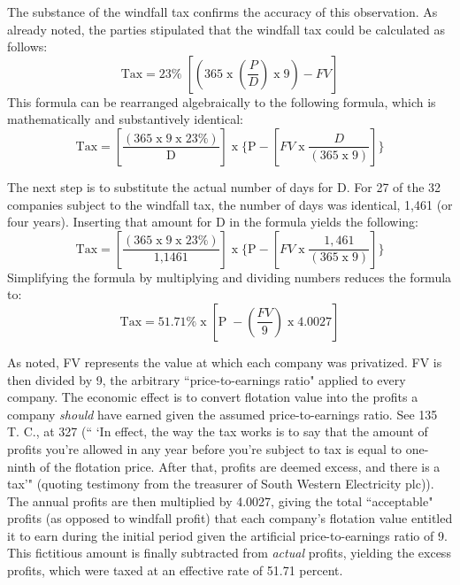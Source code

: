 \begin{select}
The substance of the windfall tax confirms the accuracy of this observation. As already noted, the parties stipulated that the windfall tax could be calculated as follows: 
\begin{displaymath}
 \textrm{Tax} = 23\%\;  [ (365\; \textrm{x}\;  (\frac{P}{D}) \; \textrm{x}\; 9)-FV]
 \end{displaymath}
This formula can be rearranged algebraically to the following formula, which is mathematically and substantively identical:
\begin{displaymath}
 \textrm{Tax} =[\frac{(365\; \textrm{x}\; 9\; \textrm{x}\; 23\%)}{\textrm{D}}] \; \textrm{x}\; \{ \textrm{P}-[FV \; \textrm{x} \; \frac{D}{(365\; \textrm{x}\; 9)}] \}
  \end{displaymath}

The next step is to substitute the actual number of days for D. For 27 of the 32 companies subject to the windfall tax, the number of days was identical, 1,461 (or four years). Inserting that amount for D in the formula yields the following: 
\begin{displaymath}
 \textrm{Tax} =[\frac{(365\; \textrm{x}\; 9\; \textrm{x}\; 23\%)}{\textrm{1,1461}}] \; \textrm{x}\; \{ \textrm{P}-[FV \; \textrm{x} \; \frac{1,461}{(365\; \textrm{x}\; 9)}] \}
  \end{displaymath}
Simplifying the formula by multiplying and dividing numbers reduces the formula to:
\begin{displaymath}
 \textrm{Tax} =51.71\% \; \textrm{x}\; [\textrm{P}\;-(\frac{FV}{9}) \; \textrm{x} \; 4.0027]
  \end{displaymath}

As noted, FV represents the value at which each company was privatized. FV is then divided by 9, the arbitrary ``price-to-earnings ratio" applied to every company. The economic effect is to convert flotation value into the profits a company \emph{should} have earned given the assumed price-to-earnings ratio. See 135 T. C., at 327 (`` `In effect, the way the tax works is to say that the amount of profits you're allowed in any year before you're subject to tax is equal to one-ninth of the flotation price. After that, profits are deemed excess, and there is a tax'" (quoting testimony from the treasurer of South Western Electricity plc)). The annual profits are then multiplied by 4.0027, giving the total ``acceptable" profits (as opposed to windfall profit) that each company's flotation value entitled it to earn during the initial period given the artificial price-to-earnings ratio of 9. This fictitious amount is finally subtracted from \emph{actual} profits, yielding the excess profits, which were taxed at an effective rate of 51.71 percent. 


\end{select}
